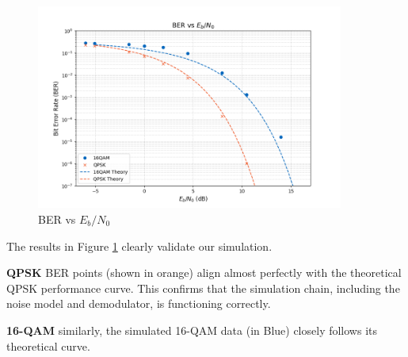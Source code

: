 \begin{figure}[H]
    \centering
    \includegraphics*[width=0.9\textwidth]{Images/BER_SNR_a3_0.png}
    \caption{BER vs $E_b/N_0$}
    \label{fig:BER_SNR_a3_0}
\end{figure}

The results in Figure \ref{fig:BER_SNR_a3_0} clearly validate our simulation.

\textbf{QPSK} BER points (shown in orange) align almost perfectly with the theoretical QPSK performance curve. This confirms that the simulation chain, including the noise model and demodulator, is functioning correctly.

\textbf{16-QAM} similarly, the simulated 16-QAM data (in Blue) closely follows its theoretical curve.

